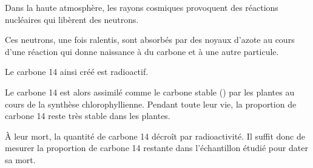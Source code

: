 \begin{minipage}{0.58\linewidth}
    \begin{Block}
    \small
    Dans la haute atmosphère, les rayons cosmiques provoquent des réactions
    nucléaires qui libèrent des neutrons.

    Ces neutrons, une fois ralentis, sont absorbés par des noyaux d'azote
     au cours d'une réaction qui donne naissance à du carbone
     et à une autre particule.

    Le carbone 14 ainsi créé est radioactif.

    Le carbone 14 est alors assimilé comme le carbone stable ()
    par les plantes au cours de la synthèse chlorophyllienne. Pendant toute leur
    vie, la proportion de carbone 14 reste très stable dans les plantes.

    À leur mort, la quantité de carbone 14 décroît par radioactivité. Il suffit
    donc de mesurer la proportion de carbone 14 restante dans l'échantillon
    étudié pour dater sa mort.
\end{Block}
\end{minipage}
\hfill

